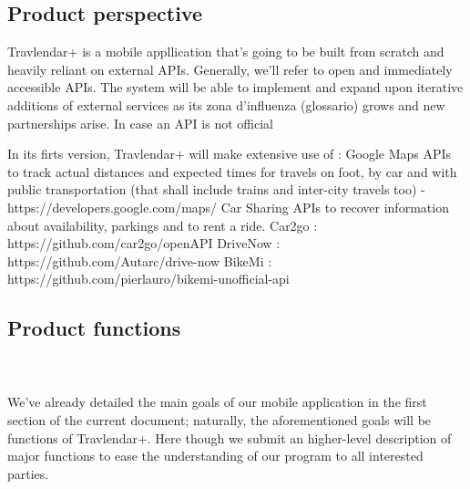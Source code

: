 \subsection{Product perspective}

Travlendar+ is a mobile appllication that’s going to be built from scratch and heavily reliant on external APIs. 
Generally, we’ll refer to open and immediately accessible APIs. The system will be able to implement and expand upon iterative additions of external services as its zona d’influenza (glossario) grows and new partnerships arise.
In case an API is not official

In its firts version, Travlendar+ will make extensive use of :
Google Maps APIs to track actual distances and expected times for travels on foot, by car and with public transportation (that shall include trains and inter-city travels too) - https://developers.google.com/maps/
Car Sharing APIs to recover information about availability, parkings and to rent a ride.
	Car2go : https://github.com/car2go/openAPI
	DriveNow : https://github.com/Autarc/drive-now 
BikeMi : https://github.com/pierlauro/bikemi-unofficial-api


			
\subsection{Product functions}
		
		\hfill \\ \\ 
 We’ve already detailed the main goals of our mobile application in the first section of the current document; naturally, the aforementioned goals will be functions of Travlendar+.
Here though we submit an higher-level description of major functions to ease the understanding of our program to all interested parties.\\
		
	

